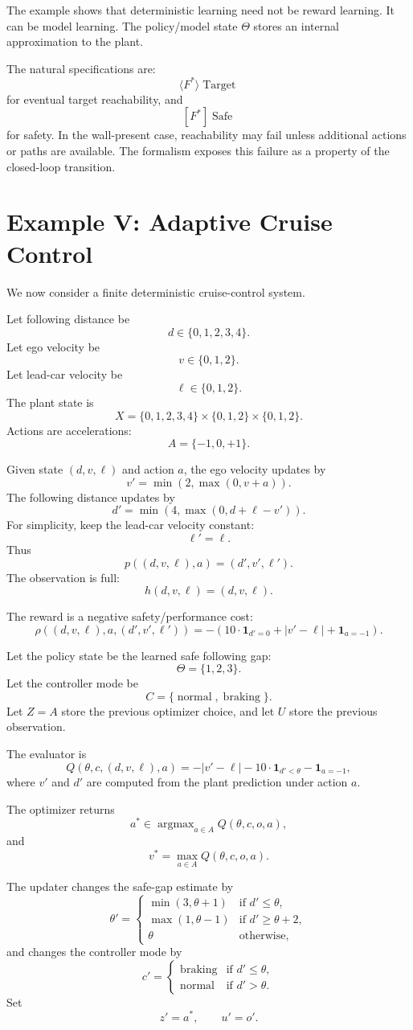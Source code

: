 The example shows that deterministic learning need not be reward learning.  It can be model
learning.  The policy/model state \(\Theta\) stores an internal approximation to the plant.

The natural specifications are:
\[
\langle F^*\rangle\operatorname{Target}
\]
for eventual target reachability, and
\[
[F^*]\operatorname{Safe}
\]
for safety.  In the wall-present case, reachability may fail unless additional actions or paths are
available.  The formalism exposes this failure as a property of the closed-loop transition.

\section{Example V: Adaptive Cruise Control}
\label{sec:example-adaptive-cruise}

We now consider a finite deterministic cruise-control system.

Let following distance be
\[
d\in\{0,1,2,3,4\}.
\]
Let ego velocity be
\[
v\in\{0,1,2\}.
\]
Let lead-car velocity be
\[
\ell\in\{0,1,2\}.
\]
The plant state is
\[
X=\{0,1,2,3,4\}\times\{0,1,2\}\times\{0,1,2\}.
\]
Actions are accelerations:
\[
A=\{-1,0,+1\}.
\]

Given state \((d,v,\ell)\) and action \(a\), the ego velocity updates by
\[
v'=\min(2,\max(0,v+a)).
\]
The following distance updates by
\[
d'=\min(4,\max(0,d+\ell-v')).
\]
For simplicity, keep the lead-car velocity constant:
\[
\ell'=\ell.
\]
Thus
\[
p((d,v,\ell),a)=(d',v',\ell').
\]
The observation is full:
\[
h(d,v,\ell)=(d,v,\ell).
\]

The reward is a negative safety/performance cost:
\[
\rho((d,v,\ell),a,(d',v',\ell'))
=
-\left(
10\cdot\mathbf 1_{d'=0}
+
|v'-\ell|
+
\mathbf 1_{a=-1}
\right).
\]

Let the policy state be the learned safe following gap:
\[
\Theta=\{1,2,3\}.
\]
Let the controller mode be
\[
C=\{\operatorname{normal},\operatorname{braking}\}.
\]
Let \(Z=A\) store the previous optimizer choice, and let \(U\) store the previous observation.

The evaluator is
\[
Q(\theta,c,(d,v,\ell),a)
=
-|v'-\ell|
-
10\cdot\mathbf 1_{d'<\theta}
-
\mathbf 1_{a=-1},
\]
where \(v'\) and \(d'\) are computed from the plant prediction under action \(a\).

The optimizer returns
\[
a^*\in\operatorname{argmax}_{a\in A}Q(\theta,c,o,a),
\]
and
\[
v^*=\max_{a\in A}Q(\theta,c,o,a).
\]

The updater changes the safe-gap estimate by
\[
\theta'=
\begin{cases}
\min(3,\theta+1) & \text{if } d'\leq \theta,\\
\max(1,\theta-1) & \text{if } d'\geq \theta+2,\\
\theta & \text{otherwise},
\end{cases}
\]
and changes the controller mode by
\[
c'=
\begin{cases}
\operatorname{braking} & \text{if } d'\leq \theta,\\
\operatorname{normal} & \text{if } d'>\theta.
\end{cases}
\]
Set
\[
z'=a^*,
\qquad
u'=o'.
\]

